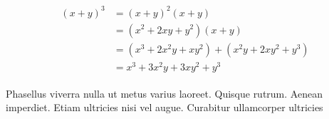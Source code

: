 \documentclass[paper=a4, fontsize=11pt]{scrartcl} %
\numberwithin{equation}{section} %
\numberwithin{figure}{section} %
\numberwithin{table}{section} %
\begin{document}
\begin{align} 
\begin{split}
(x+y)^3 	&= (x+y)^2(x+y)\\
&=(x^2+2xy+y^2)(x+y)\\
&=(x^3+2x^2y+xy^2) + (x^2y+2xy^2+y^3)\\
&=x^3+3x^2y+3xy^2+y^3
\end{split}					
\end{align}

Phasellus viverra nulla ut metus varius laoreet. Quisque rutrum. Aenean imperdiet. Etiam ultricies nisi vel augue. Curabitur ullamcorper ultricies

\end{document}
